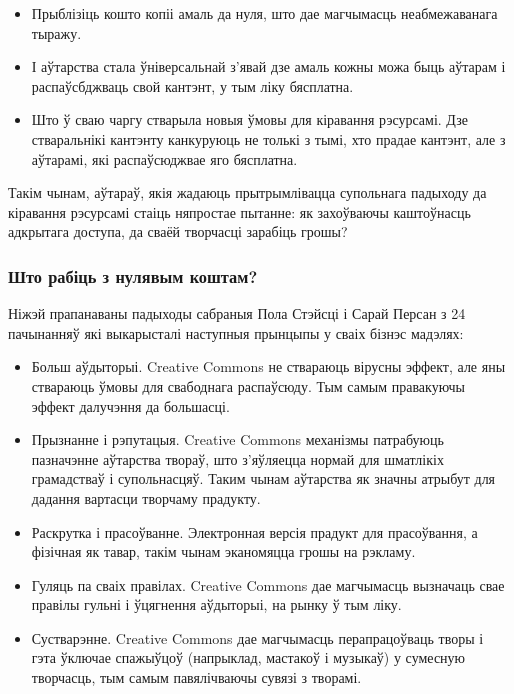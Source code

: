 \documentclass[10pt, a5paper]{article}
\begin{document}
\begin{itemize}
  \item Прыблізіць кошто копіі амаль да нуля, што дае магчымасць неабмежаванага тыражу.
  \item І аўтарства стала ўніверсальнай з’явай дзе амаль кожны можа быць аўтарам і распаўсбджваць свой кантэнт, у тым ліку бясплатна.
  \item Што ў сваю чаргу стварыла новыя ўмовы для кіравання рэсурсамі. Дзе стваральнікі кантэнту канкуруюць не толькі з тымі, хто прадае кантэнт, але з аўтарамі, які распаўсюджвае яго бясплатна.
\end{itemize}

Такім чынам, аўтараў, якія жадаюць прытрымлівацца супольнага падыходу да кіравання рэсурсамі стаіць няпростае пытанне: як захоўваючы каштоўнасць адкрытага доступа, да сваёй творчасці зарабіць грошы?

\subsubsection*{Што рабіць з нулявым коштам?}

Ніжэй прапанаваны падыходы сабраныя Пола Стэйсці і Сарай Персан з 24 пачынанняў які выкарысталі наступныя прынцыпы у сваіх бізнэс мадэлях:

\begin{itemize}
  \item Больш аўдыторыі. Creative Commons не ствараюць вірусны эффект, але яны ствараюць ўмовы для свабоднага распаўсюду. Тым самым правакуючы эффект далучэння да большасці.
  \item Прызнанне і рэпутацыя. Creative Commons механізмы патрабуюць пазначэнне аўтарства твораў, што з’яўляецца нормай для шматлікіх грамадстваў і супольнасцяў. Таким чынам \linebreak аўтарства як значны атрыбут для дадання вартасци творчаму прадукту.
  \item Раскрутка і прасоўванне. Электронная версія прадукт для прасоўвання, а фізічная як тавар, такім чынам эканомяцца грошы на рэкламу.
  \item Гуляць па сваіх правілах. Creative Commons дае магчымасць вызначаць свае правілы гульні і ўцягнення аўдыторыі, на рынку ў тым ліку.
  \item Сустварэнне. Creative Commons дае магчымасць перапрацоўваць творы і гэта ўключае спажыўцоў (напрыклад, мастакоў і музыкаў) у сумесную творчасць, тым самым павялічваючы сувязі з творамі.
\end{itemize}
\end{document}
